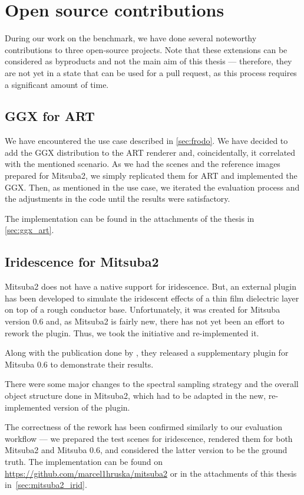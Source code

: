 \section{Open source contributions}

During our work on the benchmark, we have done several noteworthy contributions to three open-source projects. Note that these extensions can be considered as byproducts and not the main aim of this thesis --- therefore, they are not yet in a state that can be used for a pull request, as this process requires a significant amount of time.

\subsection{GGX for ART}

We have encountered the use case described in \autoref{sec:frodo}. We have decided to add the GGX distribution to the ART renderer and, coincidentally, it correlated with the mentioned scenario. As we had the scenes and the reference images prepared for Mitsuba2, we simply replicated them for ART and implemented the GGX. Then, as mentioned in the use case, we iterated the evaluation process and the adjustments in the code until the results were satisfactory.

The implementation can be found in the attachments of the thesis in \autoref{sec:ggx_art}.

\subsection{Iridescence for Mitsuba2}

Mitsuba2 does not have a native support for iridescence. But, an external plugin has been developed to simulate the iridescent effects of a thin film dielectric layer on top of a rough conductor base. Unfortunately, it was created for Mitsuba version 0.6 and, as Mitsuba2 is fairly new, there has not yet been an effort to rework the plugin. Thus, we took the initiative and re-implemented it.

Along with the publication done by \citet{belcour2017practical}, they released a supplementary plugin for Mitsuba 0.6 to demonstrate their results.

There were some major changes to the spectral sampling strategy and the overall object structure done in Mitsuba2, which had to be adapted in the new, re-implemented version of the plugin.

The correctness of the rework has been confirmed similarly to our evaluation workflow --- we prepared the test scenes for iridescence, rendered them for both Mitsuba2 and Mitsuba 0.6, and considered the latter version to be the ground truth. The implementation can be found on \url{https://github.com/marcel1hruska/mitsuba2} or in the attachments of this thesis in~\autoref{sec:mitsuba2_irid}.

